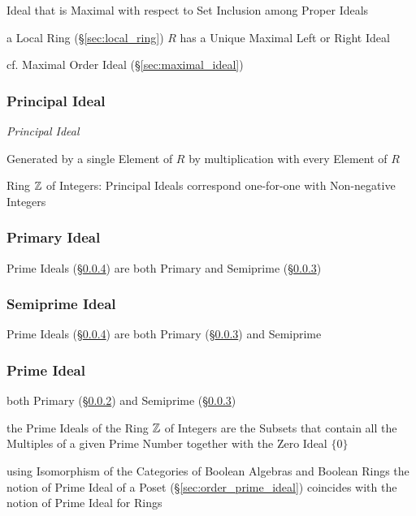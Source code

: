 Ideal that is Maximal with respect to Set Inclusion among Proper Ideals

a Local Ring (\S\ref{sec:local_ring}) $R$ has a Unique Maximal Left or Right
Ideal

cf. Maximal Order Ideal (\S\ref{sec:maximal_ideal})



\subsubsection{Principal Ideal}\label{sec:principal_ideal}

\emph{Principal Ideal}

Generated by a single Element of $R$ by multiplication with every
Element of $R$

Ring $\mathbb{Z}$ of Integers: Principal Ideals correspond one-for-one with
Non-negative Integers



\subsubsection{Primary Ideal}\label{sec:primary_ideal}

Prime Ideals (\S\ref{sec:prime_ideal}) are both Primary and Semiprime
(\S\ref{sec:semiprime_ideal})



\subsubsection{Semiprime Ideal}\label{sec:semiprime_ideal}

Prime Ideals (\S\ref{sec:prime_ideal}) are both Primary
(\S\ref{sec:semiprime_ideal}) and Semiprime



\subsubsection{Prime Ideal}\label{sec:prime_ideal}

both Primary (\S\ref{sec:primary_ideal}) and Semiprime
(\S\ref{sec:semiprime_ideal})

the Prime Ideals of the Ring $\mathbb{Z}$ of Integers are the Subsets that contain
all the Multiples of a given Prime Number together with the Zero Ideal $\{0\}$

\fist using Isomorphism of the Categories of Boolean Algebras and Boolean Rings
the notion of Prime Ideal of a Poset (\S\ref{sec:order_prime_ideal}) coincides
with the notion of Prime Ideal for Rings

